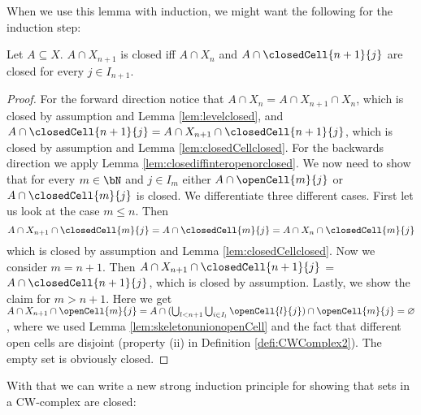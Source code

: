 When we use this lemma with induction, we might want the following for the induction step:

\begin{lem}
    Let $A \subseteq X$. $A \cap X_{n + 1}$ is closed iff $A \cap X_n$ and $A \cap \closedCell{n + 1}{j}$ are closed for every $j \in I_{n + 1}$. \href{https://github.com/scholzhannah/CWComplexes/blob/7be4872a05b534011cc969eb5b80a4b7f0bf57e2/CWcomplexes/Lemmas.lean#L38-L83}{\faExternalLink}
\end{lem}
\begin{proof}
    For the forward direction notice that $A \cap X_n = A \cap X_{n + 1} \cap X_n$, which is closed by assumption and Lemma \ref{lem:levelclosed}, and $A \cap \closedCell{n + 1}{j} = A \cap X_{n + 1} \cap \closedCell{n + 1}{j}$, which is closed by assumption and Lemma \ref{lem:closedCellclosed}.
    For the backwards direction we apply Lemma \ref{lem:closediffinteropenorclosed}. 
    We now need to show that for every $m \in \bN$ and $j \in I_m$ either $A \cap \openCell{m}{j}$ or $A \cap \closedCell{m}{j}$ is closed. 
    We differentiate three different cases. 
    First let us look at the case $m \le n$.
    Then 
    \[A \cap X_{n + 1} \cap \closedCell{m}{j} = A \cap \closedCell{m}{j} = A \cap X_n \cap \closedCell{m}{j}\]
    which is closed by assumption and Lemma \ref{lem:closedCellclosed}. 
    Now we consider $m = n + 1$. 
    Then $A \cap X_{n + 1} \cap \closedCell{n + 1}{j}$ = $A \cap \closedCell{n + 1}{j}$, which is closed by assumption. 
    Lastly, we show the claim for $m > n + 1$. 
    Here we get $A \cap X_{n + 1} \cap \openCell{m}{j} = A \cap (\bigcup_{l < n + 1}\bigcup_{i \in I_l}\openCell{l}{j} ) \cap \openCell{m}{j} = \varnothing$, where we used Lemma \ref{lem:skeletonunionopenCell} and the fact that different open cells are disjoint (property (ii) in Definition \ref{defi:CWComplex2}). 
    The empty set is obviously closed.
\end{proof}

With that we can write a new strong induction principle for showing that sets in a CW-complex are closed: 

